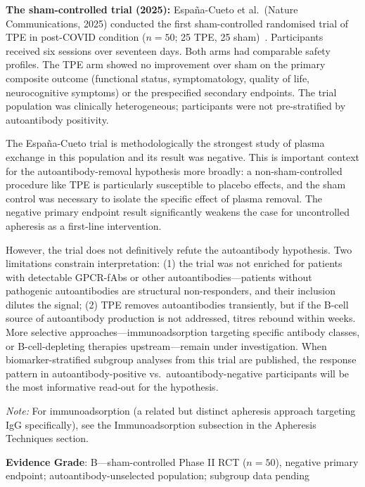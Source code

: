 \textbf{The sham-controlled trial (2025):} España-Cueto et al.\ (Nature Communications, 2025) conducted the first sham-controlled randomised trial of TPE in post-COVID condition ($n=50$; 25 TPE, 25 sham)~\cite{EspanaCueto2025plasmaexchange}. Participants received six sessions over seventeen days. Both arms had comparable safety profiles. The TPE arm showed no improvement over sham on the primary composite outcome (functional status, symptomatology, quality of life, neurocognitive symptoms) or the prespecified secondary endpoints. The trial population was clinically heterogeneous; participants were not pre-stratified by autoantibody positivity.

\begin{warning}
The España-Cueto trial is methodologically the strongest study of plasma exchange in this population and its result was negative. This is important context for the autoantibody-removal hypothesis more broadly: a non-sham-controlled procedure like TPE is particularly susceptible to placebo effects, and the sham control was necessary to isolate the specific effect of plasma removal. The negative primary endpoint result significantly weakens the case for uncontrolled apheresis as a first-line intervention.

However, the trial does not definitively refute the autoantibody hypothesis. Two limitations constrain interpretation: (1) the trial was not enriched for patients with detectable GPCR-fAbs or other autoantibodies---patients without pathogenic autoantibodies are structural non-responders, and their inclusion dilutes the signal; (2) TPE removes autoantibodies transiently, but if the B-cell source of autoantibody production is not addressed, titres rebound within weeks. More selective approaches---immunoadsorption targeting specific antibody classes, or B-cell-depleting therapies upstream---remain under investigation. When biomarker-stratified subgroup analyses from this trial are published, the response pattern in autoantibody-positive vs.\ autoantibody-negative participants will be the most informative read-out for the hypothesis.
\end{warning}

\textit{Note:} For immunoadsorption (a related but distinct apheresis approach targeting IgG specifically), see the Immunoadsorption subsection in the Apheresis Techniques section.

\textbf{Evidence Grade}: B---sham-controlled Phase II RCT ($n=50$), negative primary endpoint; autoantibody-unselected population; subgroup data pending

